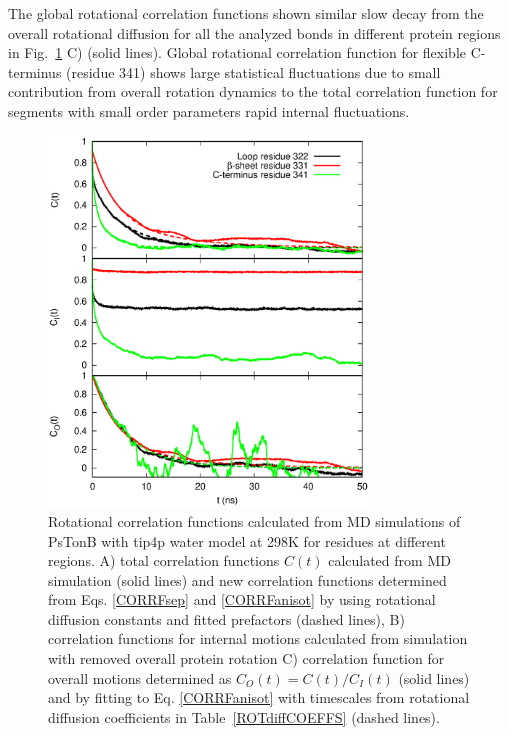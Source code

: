 \documentclass[pre,aps,floatfix,authordate1-4,twocolumn]{revtex4-1}
\begin{document}
The global rotational correlation functions shown similar slow decay
from the overall rotational diffusion
for all the analyzed bonds in different protein regions in Fig.~\ref{exampleCORRF} C) (solid lines).
Global rotational correlation function for flexible C-terminus (residue 341) shows
large statistical fluctuations due to small contribution from overall rotation
dynamics to the total correlation function for segments with small order parameters
rapid internal fluctuations.
\begin{figure}[!h]
  \includegraphics[width=8.5cm]{../Figs/exampleCORRF2.eps}%
  \caption{Rotational correlation functions calculated from MD simulations of PsTonB with tip4p water
    model at 298K for residues at different regions.
    A) total correlation functions $C(t)$ calculated from MD simulation (solid lines) and
    new correlation functions determined from Eqs. \ref{CORRFsep} and \ref{CORRFanisot} by
    using rotational diffusion constants and fitted prefactors (dashed lines),
    B) correlation functions for internal motions calculated from simulation with removed overall protein rotation
    C) correlation function for overall motions determined as $C_O(t)=C(t)/C_I(t)$ (solid lines) and by fitting
    to Eq. \ref{CORRFanisot} with timescales from rotational diffusion coefficients in Table~\ref{ROTdiffCOEFFS} (dashed lines).
    }\label{exampleCORRF}
\end{figure}
\end{document}
